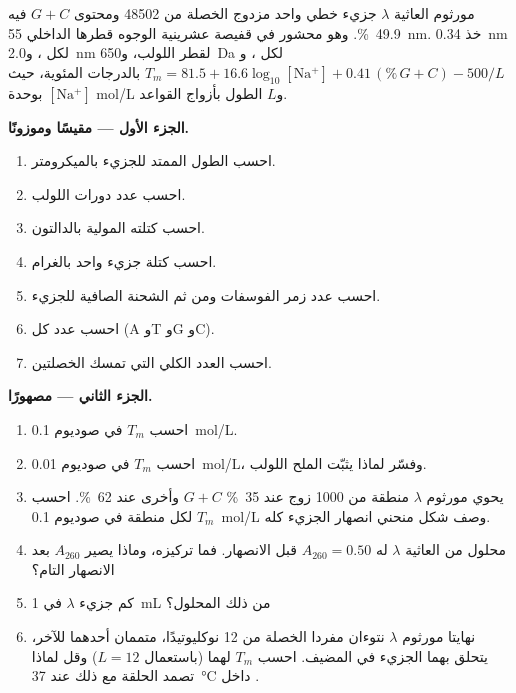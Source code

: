 \begin{problem}
\label{pb:b1:nucleic-acids:1}
مورثوم العاثية $\lambda$ جزيء  خطي واحد مزدوج الخصلة من
\num{48502}  ومحتوى $G + C$ فيه \qty{49.9}{\%}. وهو محشور
في قفيصة عشرينية الوجوه قطرها الداخلي \qty{55}{nm}. خذ \qty{0.34}{nm}
لكل ، و\qty{2.0}{nm} لقطر اللولب، و\qty{650}{Da} لكل ، و$T_m = 81.5 + 16.6\log_{10}[\mathrm{Na^+}]
+ 0.41\,(\%\,G{+}C) - 500/L$ بالدرجات المئوية، حيث $[\mathrm{Na^+}]$
بوحدة \unit{mol/L} و$L$ الطول بأزواج القواعد.

\medskip
\noindent\textbf{الجزء الأول --- مقيسًا وموزونًا.}
\begin{enumerate}
  \item احسب الطول الممتد للجزيء بالميكرومتر.
  \item احسب عدد دورات اللولب.
  \item احسب كتلته المولية بالدالتون.
  \item احسب كتلة جزيء واحد بالغرام.
  \item احسب عدد زمر الفوسفات ومن ثم الشحنة الصافية للجزيء.
  \item احسب عدد  كل  (A وT وG وC).
  \item احسب العدد الكلي  التي تمسك الخصلتين.
\end{enumerate}

\medskip
\noindent\textbf{الجزء الثاني --- مصهورًا.}
\begin{enumerate}[resume]
  \item احسب $T_m$ في صوديوم \qty{0.1}{mol/L}.
  \item احسب $T_m$ في صوديوم \qty{0.01}{mol/L}، وفسّر لماذا يثبّت
        الملح اللولب.
  \item يحوي مورثوم $\lambda$ منطقة من \qty{1000}{} زوج عند
        \qty{35}{\%} $G + C$ وأخرى عند \qty{62}{\%}. احسب $T_m$ لكل
        منطقة في صوديوم \qty{0.1}{mol/L} وصف شكل منحني انصهار الجزيء
        كله.
  \item محلول من  العاثية $\lambda$ له $A_{260} = 0.50$ قبل
        الانصهار. فما تركيزه، وماذا يصير $A_{260}$ بعد الانصهار التام؟
  \item كم جزيء $\lambda$ في \qty{1}{mL} من ذلك المحلول؟
  \item نهايتا مورثوم $\lambda$ نتوءان مفردا الخصلة من 12 نوكليوتيدًا،
        متممان أحدهما للآخر، يتحلق بهما الجزيء في المضيف. احسب $T_m$
        لهما (باستعمال $L = 12$) وقل لماذا تصمد الحلقة مع ذلك عند
        \qty{37}{\celsius} داخل .
\end{enumerate}


\end{problem}
